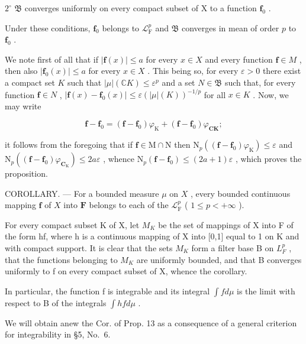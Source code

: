 \(2^{\circ}\) \(\mathfrak{B}\) converges uniformly on every compact subset of X to a function \(\mathbf{f}_0\) .

Under these conditions, \(\mathbf{f}_0\) belongs to \(\mathcal{L}_{\mathrm{F}}^{p}\) and \(\mathfrak{B}\) converges in mean of order \(p\) to \(\mathbf{f}_0\) .

We note first of all that if \(|\mathbf{f}(x)| \leqslant a\) for every \(x \in X\) and every function \(\mathbf{f} \in M\) , then also \(|\mathbf{f}_0(x)| \leqslant a\) for every \(x \in X\) . This being so, for every \(\varepsilon > 0\) there exist a compact set \(K\) such that \(|\mu|(\mathbb{C}K) \leqslant \varepsilon^p\) and a set \(N \in \mathfrak{B}\) such that, for every function \(\mathbf{f} \in N\) , \(|\mathbf{f}(x) - \mathbf{f}_0(x)| \leqslant \varepsilon(|\mu|(K))^{-1/p}\) for all \(x \in K\) . Now, we may write

\[
\mathbf {f} - \mathbf {f} _ {0} = (\mathbf {f} - \mathbf {f} _ {0}) \varphi_ {\mathrm{K}} + (\mathbf {f} - \mathbf {f} _ {0}) \varphi_ {\mathbf {C K}};
\]

it follows from the foregoing that if \(\mathbf{f} \in \mathrm{M} \cap \mathrm{N}\) then \(\mathrm{N}_p((\mathbf{f} - \mathbf{f}_0)\varphi_{\mathrm{K}}) \leqslant \varepsilon\) and \(\mathrm{N}_p((\mathbf{f} - \mathbf{f}_0)\varphi_{\mathbf{C}_{\mathrm{K}}}) \leqslant 2a\varepsilon\) , whence \(\mathrm{N}_p(\mathbf{f} - \mathbf{f}_0) \leqslant (2a + 1)\varepsilon\) , which proves the proposition.

COROLLARY. --- For a bounded measure \(\mu\) on \(X\) , every bounded continuous mapping \(\mathbf{f}\) of \(X\) into \(\mathbf{F}\) belongs to each of the \(\mathcal{L}_{\mathrm{F}}^{p}\) ( \(1 \leqslant p < +\infty\) ).

For every compact subset K of X, let \(M_{K}\) be the set of mappings of X into F of the form hf, where h is a continuous mapping of X into {[}0,1{]} equal to 1 on K and with compact support. It is clear that the sets \(M_{K}\) form a filter base B on \(L_{F}^{p}\) , that the functions belonging to \(M_{K}\) are uniformly bounded, and that B converges uniformly to f on every compact subset of X, whence the corollary.

In particular, the function f is integrable and its integral \(\int f d\mu\) is the limit with respect to B of the integrals \(\int h f d\mu\) .

We will obtain anew the Cor. of Prop. 13 as a consequence of a general criterion for integrability in §5, No.~6.

